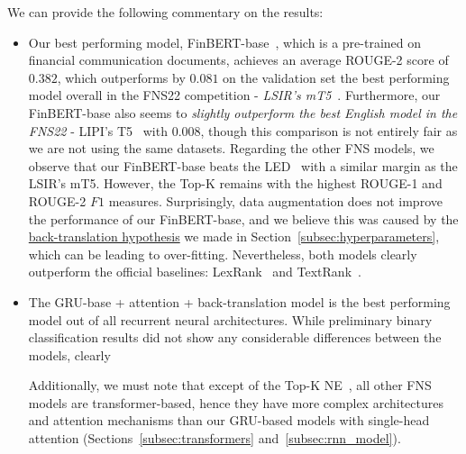 We can provide the following commentary on the results:
\begin{itemize}
    \item Our best performing model, FinBERT-base~\cite{yang2020finbert}, which is a pre-trained on financial communication documents,
        achieves an average ROUGE-2 score of $0.382$, which outperforms by $0.081$ on the validation set the best performing
        model overall in the FNS22 competition - \emph{LSIR's mT5}~\cite{foroutan-etal-2022-multilingual}.
        Furthermore, our FinBERT-base also seems to \emph{slightly outperform the best English model in the FNS22} - LIPI's T5~\cite{el-haj-etal-2022-financial} with $0.008$,
        though this comparison is not entirely fair as we are not using the same datasets.
        Regarding the other FNS models, we observe that our FinBERT-base beats the LED~\cite{khanna-etal-2022-transformer} with a similar margin as the LSIR's mT5.
        However, the Top-K remains with the highest ROUGE-1 and ROUGE-2 $F1$ measures.
        Surprisingly, data augmentation does not improve the performance of our FinBERT-base, and we believe this was caused by
        the \hyperlink{data_augment_hypothesis}{back-translation hypothesis} we made in Section~\ref{subsec:hyperparameters}, which can be leading to over-fitting.
        Nevertheless, both models clearly outperform the official baselines: LexRank~\cite{Erkan2004LexRankGC} and TextRank~\cite{mihalcea-tarau-2004-textrank}.
    \item The GRU-base + attention + back-translation model is the best performing model out of all recurrent neural architectures.
    While preliminary binary classification results did not show any considerable differences between the models, clearly
    Additionally, we must note that except of the Top-K NE~\cite{shukla-etal-2022-dimsum}, all other FNS models are transformer-based,
    hence they have more complex architectures and attention mechanisms than our GRU-based models with single-head attention (Sections~\ref{subsec:transformers} and~\ref{subsec:rnn_model}).

\end{itemize}
